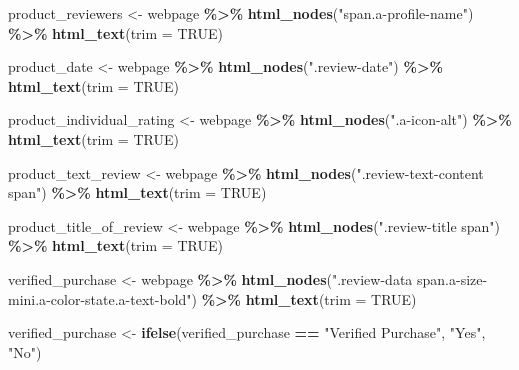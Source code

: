 \documentclass[
  11pt,
]{article}
\newenvironment{Shaded}{\begin{snugshade}}{\end{snugshade}}
\newcommand{\AttributeTok}[1]{\textcolor[rgb]{0.13,0.29,0.53}{#1}}
\newcommand{\ConstantTok}[1]{\textcolor[rgb]{0.56,0.35,0.01}{#1}}
\newcommand{\FunctionTok}[1]{\textcolor[rgb]{0.13,0.29,0.53}{\textbf{#1}}}
\newcommand{\NormalTok}[1]{#1}
\newcommand{\OtherTok}[1]{\textcolor[rgb]{0.56,0.35,0.01}{#1}}
\newcommand{\SpecialCharTok}[1]{\textcolor[rgb]{0.81,0.36,0.00}{\textbf{#1}}}
\newcommand{\StringTok}[1]{\textcolor[rgb]{0.31,0.60,0.02}{#1}}
\begin{document}
\begin{Shaded}
\begin{Highlighting}[]
\NormalTok{  product\_reviewers }\OtherTok{\textless{}{-}}\NormalTok{ webpage }\SpecialCharTok{\%\textgreater{}\%}
    \FunctionTok{html\_nodes}\NormalTok{(}\StringTok{"span.a{-}profile{-}name"}\NormalTok{) }\SpecialCharTok{\%\textgreater{}\%}
    \FunctionTok{html\_text}\NormalTok{(}\AttributeTok{trim =} \ConstantTok{TRUE}\NormalTok{)}
  
  
\NormalTok{  product\_date }\OtherTok{\textless{}{-}}\NormalTok{ webpage }\SpecialCharTok{\%\textgreater{}\%} 
    \FunctionTok{html\_nodes}\NormalTok{(}\StringTok{".review{-}date"}\NormalTok{) }\SpecialCharTok{\%\textgreater{}\%}
    \FunctionTok{html\_text}\NormalTok{(}\AttributeTok{trim =} \ConstantTok{TRUE}\NormalTok{)}
  
  
\NormalTok{  product\_individual\_rating }\OtherTok{\textless{}{-}}\NormalTok{ webpage }\SpecialCharTok{\%\textgreater{}\%}
    \FunctionTok{html\_nodes}\NormalTok{(}\StringTok{".a{-}icon{-}alt"}\NormalTok{) }\SpecialCharTok{\%\textgreater{}\%}
    \FunctionTok{html\_text}\NormalTok{(}\AttributeTok{trim =} \ConstantTok{TRUE}\NormalTok{)}
  
  
\NormalTok{  product\_text\_review }\OtherTok{\textless{}{-}}\NormalTok{ webpage }\SpecialCharTok{\%\textgreater{}\%}
    \FunctionTok{html\_nodes}\NormalTok{(}\StringTok{".review{-}text{-}content span"}\NormalTok{) }\SpecialCharTok{\%\textgreater{}\%}
    \FunctionTok{html\_text}\NormalTok{(}\AttributeTok{trim =} \ConstantTok{TRUE}\NormalTok{)}
  
  
\NormalTok{  product\_title\_of\_review }\OtherTok{\textless{}{-}}\NormalTok{ webpage }\SpecialCharTok{\%\textgreater{}\%}
    \FunctionTok{html\_nodes}\NormalTok{(}\StringTok{".review{-}title span"}\NormalTok{) }\SpecialCharTok{\%\textgreater{}\%}
    \FunctionTok{html\_text}\NormalTok{(}\AttributeTok{trim =} \ConstantTok{TRUE}\NormalTok{)}
  
  
\NormalTok{  verified\_purchase }\OtherTok{\textless{}{-}}\NormalTok{ webpage }\SpecialCharTok{\%\textgreater{}\%}
    \FunctionTok{html\_nodes}\NormalTok{(}\StringTok{".review{-}data span.a{-}size{-}mini.a{-}color{-}state.a{-}text{-}bold"}\NormalTok{) }\SpecialCharTok{\%\textgreater{}\%}
    \FunctionTok{html\_text}\NormalTok{(}\AttributeTok{trim =} \ConstantTok{TRUE}\NormalTok{)}
  
  
\NormalTok{  verified\_purchase }\OtherTok{\textless{}{-}} \FunctionTok{ifelse}\NormalTok{(verified\_purchase }\SpecialCharTok{==} \StringTok{"Verified Purchase"}\NormalTok{, }\StringTok{"Yes"}\NormalTok{, }\StringTok{"No"}\NormalTok{)}
  

\end{Highlighting}
\end{Shaded}
\end{document}
